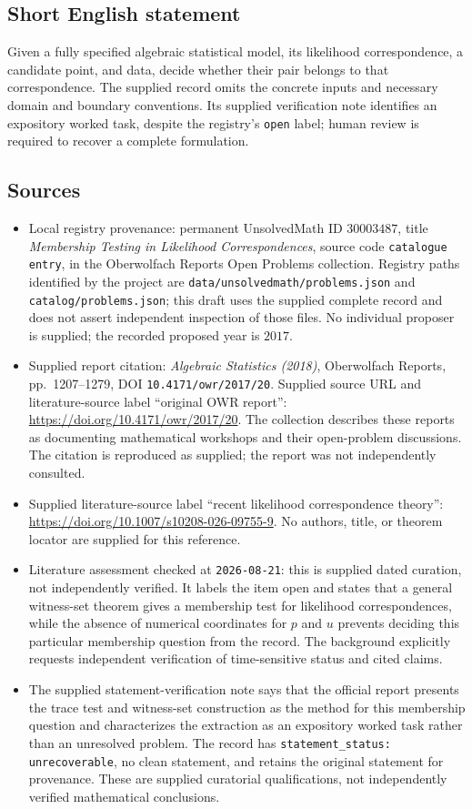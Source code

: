 \documentclass[11pt]{article}
\begin{document}
\subsection{Short English statement}
Given a fully specified algebraic statistical model, its likelihood correspondence, a candidate point, and data, decide whether their pair belongs to that correspondence. The supplied record omits the concrete inputs and necessary domain and boundary conventions. Its supplied verification note identifies an expository worked task, despite the registry's \texttt{open} label; human review is required to recover a complete formulation.
\subsection{Sources}
\begin{itemize}
\item Local registry provenance: permanent UnsolvedMath ID \(30003487\), title \emph{Membership Testing in Likelihood Correspondences}, source code \texttt{catalogue entry}, in the Oberwolfach Reports Open Problems collection. Registry paths identified by the project are \texttt{data/unsolvedmath/problems.json} and \texttt{catalog/problems.json}; this draft uses the supplied complete record and does not assert independent inspection of those files. No individual proposer is supplied; the recorded proposed year is \(2017\).
\item Supplied report citation: \emph{Algebraic Statistics (2018)}, Oberwolfach Reports, pp.\ 1207--1279, DOI \texttt{10.4171/owr/2017/20}. Supplied source URL and literature-source label ``original OWR report'': \url{https://doi.org/10.4171/owr/2017/20}. The collection describes these reports as documenting mathematical workshops and their open-problem discussions. The citation is reproduced as supplied; the report was not independently consulted.
\item Supplied literature-source label ``recent likelihood correspondence theory'': \url{https://doi.org/10.1007/s10208-026-09755-9}. No authors, title, or theorem locator are supplied for this reference.
\item Literature assessment checked at \texttt{2026-08-21}: this is supplied dated curation, not independently verified. It labels the item open and states that a general witness-set theorem gives a membership test for likelihood correspondences, while the absence of numerical coordinates for \(p\) and \(u\) prevents deciding this particular membership question from the record. The background explicitly requests independent verification of time-sensitive status and cited claims.
\item The supplied statement-verification note says that the official report presents the trace test and witness-set construction as the method for this membership question and characterizes the extraction as an expository worked task rather than an unresolved problem. The record has \texttt{statement\_status: unrecoverable}, no clean statement, and retains the original statement for provenance. These are supplied curatorial qualifications, not independently verified mathematical conclusions.
\end{itemize}
\end{document}
